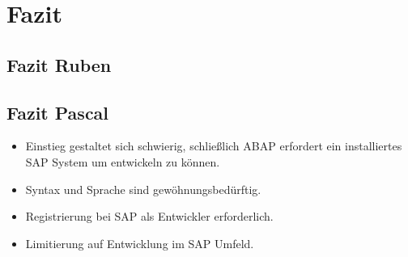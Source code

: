 \section{Fazit}

\subsection{Fazit Ruben}
\subsection{Fazit Pascal}
\begin{itemize}
    \item Einstieg gestaltet sich schwierig, schließlich ABAP erfordert ein installiertes SAP System um entwickeln zu können.
    \item Syntax und Sprache sind gewöhnungsbedürftig.
    \item Registrierung bei SAP als Entwickler erforderlich.
    \item Limitierung auf Entwicklung im SAP Umfeld.
\end{itemize}

\newpage